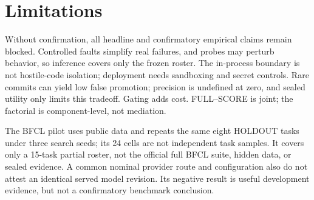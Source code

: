 \section{Limitations}
\label{sec:limitations}

Without confirmation, all headline and confirmatory empirical claims remain
blocked.  Controlled faults simplify real failures, and probes may perturb
behavior, so inference covers only the frozen roster.  The in-process boundary
is not hostile-code isolation; deployment needs sandboxing and secret controls.
Rare commits can yield low false promotion; precision is undefined at zero,
and sealed utility only limits this tradeoff.  Gating adds cost.  FULL--SCORE
is joint; the factorial is component-level, not mediation.

The BFCL pilot uses public data and repeats the same eight HOLDOUT tasks under
three search seeds; its 24 cells are not independent task samples.  It covers
only a 15-task partial roster, not the official full BFCL suite, hidden data, or
sealed evidence.  A common nominal provider route and configuration also do
not attest an identical served model revision.  Its negative result is useful
development evidence, but not a confirmatory benchmark conclusion.
